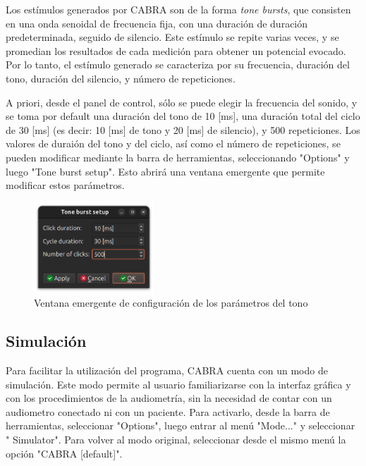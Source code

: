 Los estímulos generados por CABRA son de la forma \textit{tone bursts}, que consisten en una onda senoidal de
frecuencia fija, con una duración de duración predeterminada, seguido de silencio.
Este estímulo se repite varias veces, y se promedian los resultados de cada medición para obtener un potencial evocado.
Por lo tanto, el estímulo generado se caracteriza por su frecuencia, duración del tono, duración del silencio, y
número de repeticiones.

A priori, desde el panel de control, sólo se puede elegir la frecuencia del sonido, y se toma por default una
duración del tono de 10 [ms], una duración total del ciclo de 30 [ms] (es decir: 10 [ms] de tono y 20 [ms] de
silencio), y 500 repeticiones.
Los valores de duraión del tono y del ciclo, así como el número de repeticiones, se pueden modificar mediante la
barra de herramientas, seleccionando "Options" y luego "Tone burst setup".
Esto abrirá una ventana emergente que permite modificar estos parámetros.

\begin{figure}[H]
    \centering
    \includegraphics[width=0.4\textwidth]{figuras/tone_bursts_setup}
    \caption{Ventana emergente de configuración de los parámetros del tono}
    \label{fig:GUI_tone_burst_setup}
\end{figure}

\subsection{Simulación} \label{simulacion}

Para facilitar la utilización del programa, CABRA cuenta con un modo de simulación.
Este modo permite al usuario familiarizarse con la interfaz gráfica y con los procedimientos de la audiometría, sin
la necesidad de contar con un audiometro conectado ni con un paciente.
Para activarlo, desde la barra de herramientas, seleccionar "Options", luego entrar al menú "Mode..." y seleccionar "
Simulator".
Para volver al modo original, seleccionar desde el mismo menú la opción "CABRA [default]".

